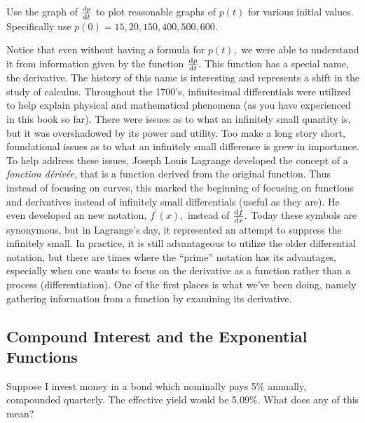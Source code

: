 \begin{embeddedproblem}
  Use the graph of $\frac{\text{d}{p}}{\text{d}{t}}$ to plot
  reasonable graphs of $p(t)$ for various initial values.  Specifically
  use $p(0)=15, 20, 150, 400, 500, 600.$ 


  Notice that even without having a formula for $p(t),$ we were able
  to understand it from information given by the function
  $\frac{\text{d}{p}}{\text{d}{t}}.$ This function has a special name, the derivative. The
  history of this name is interesting and represents a shift in the
  study of calculus.  Throughout the 1700's, infinitesimal
  differentials were utilized to help explain physical and
  mathematical phenomena (as you have experienced in this book so
  far).  There were issues as to what an infinitely small quantity is,
  but it was overshadowed by its power and utility.  Too make a long
  story short, foundational issues as to what an infinitely small
  difference is grew in importance.  To help address these issues,
  Joseph Louis Lagrange developed the concept of a {\it fonction d\'eriv\'e{}e},
  that is a function derived from the original function.  Thus instead
  of focusing on curves, this marked the beginning of focusing on
  functions and derivatives instead of infinitely small differentials
  (useful as they are).  He even developed an new notation, $f^\prime(x),$
  instead of $\frac{\text{d}{f}}{\text{d}{x}}.$  Today these symbols are synonymous, but
  in Lagrange's day, it represented an attempt to suppress the
  infinitely small.  In practice, it is still advantageous to utilize
  the older differential notation, but there are times where the
  ``prime'' notation has its advantages, especially when one wants to
  focus on the derivative as a function rather than a process
  (differentiation).  One of the first places is what we've been
  doing, namely gathering information from a function by examining its
  derivative.

\end{embeddedproblem}

\subsection{Compound Interest and the Exponential Functions}
Suppose I invest money in a bond which nominally pays 5\% annually,
compounded quarterly.  The effective yield would be 5.09\%.  What does
any of this mean?

